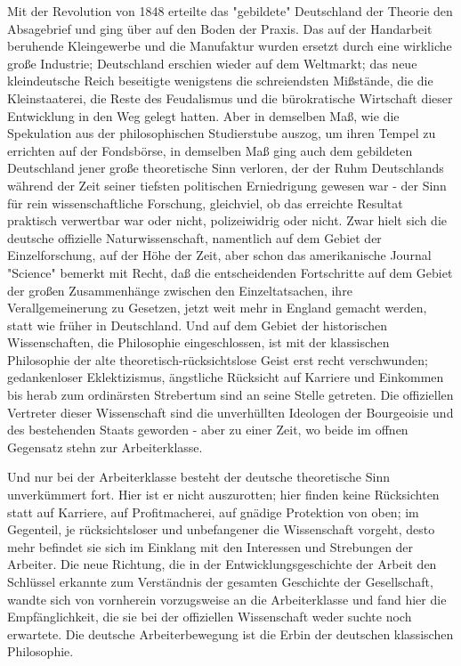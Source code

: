 Mit der Revolution von 1848 erteilte das "gebildete" Deutschland
der Theorie den Absagebrief und ging über auf den Boden der Praxis. Das
auf der Handarbeit beruhende Kleingewerbe und die Manufaktur wurden
ersetzt durch eine wirkliche große Industrie; Deutschland erschien
wieder auf dem Weltmarkt; das neue kleindeutsche Reich beseitigte
wenigstens die schreiendsten Mißstände, die die Kleinstaaterei, die
Reste des Feudalismus und die bürokratische Wirtschaft dieser
Entwicklung in den Weg gelegt hatten. Aber in demselben Maß, wie die
Spekulation aus der philosophischen Studierstube auszog, um ihren Tempel
zu errichten auf der Fondsbörse, in demselben Maß ging auch dem
gebildeten Deutschland jener große theoretische Sinn verloren, der der
Ruhm Deutschlands während der Zeit seiner tiefsten politischen
Erniedrigung gewesen war - der Sinn für rein wissenschaftliche
Forschung, gleichviel, ob das erreichte Resultat praktisch verwertbar
war oder nicht, polizeiwidrig oder nicht. Zwar hielt sich die deutsche
offizielle Naturwissenschaft, namentlich auf dem Gebiet der
Einzelforschung, auf der Höhe der Zeit, aber schon das amerikanische
Journal "Science" bemerkt mit Recht, daß die entscheidenden Fortschritte
auf dem Gebiet der großen Zusammenhänge zwischen den Einzeltatsachen,
ihre Verallgemeinerung zu Gesetzen, jetzt weit mehr in England gemacht
werden, statt wie früher in Deutschland. Und auf dem Gebiet der
historischen Wissenschaften, die Philosophie eingeschlossen, ist mit der
klassischen Philosophie der alte theoretisch-rücksichtslose Geist erst
recht verschwunden; gedankenloser Eklektizismus, ängstliche Rücksicht
auf Karriere und Einkommen bis herab zum ordinärsten Strebertum sind an
seine Stelle getreten. Die offiziellen Vertreter dieser Wissenschaft
sind die unverhüllten Ideologen der Bourgeoisie und des bestehenden
Staats geworden - aber zu einer Zeit, wo beide im offnen Gegensatz stehn
zur Arbeiterklasse.

Und nur bei der Arbeiterklasse besteht der deutsche theoretische
Sinn unverkümmert fort. Hier ist er nicht auszurotten; hier finden keine
Rücksichten statt auf Karriere, auf Profitmacherei, auf gnädige
Protektion von oben; im Gegenteil, je rücksichtsloser und unbefangener
die Wissenschaft vorgeht, desto mehr befindet sie sich im Einklang mit
den Interessen und Strebungen der Arbeiter. Die neue Richtung, die in
der Entwicklungsgeschichte der Arbeit den Schlüssel erkannte zum
Verständnis der gesamten Geschichte der Gesellschaft, wandte sich von
vornherein vorzugsweise an die Arbeiterklasse und fand hier die
Empfänglichkeit, die sie bei der offiziellen Wissenschaft weder suchte
noch erwartete. Die deutsche Arbeiterbewegung ist die Erbin der
deutschen klassischen Philosophie.

